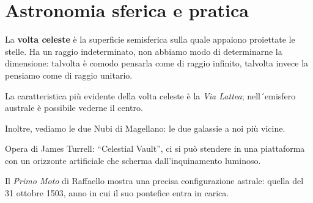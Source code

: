\documentclass[main.tex]{subfiles}
\begin{document}
\section{Astronomia sferica e pratica}


La \textbf{volta celeste} è la superficie semisferica sulla quale appaiono proiettate le stelle. Ha un raggio indeterminato, non abbiamo modo di determinarne la dimensione: talvolta è comodo pensarla come di raggio infinito, talvolta invece la pensiamo come di raggio unitario.

La caratteristica più evidente della volta celeste è la \textit{Via Lattea}; nell´emisfero australe è possibile vederne il centro. 


Inoltre, vediamo le due Nubi di Magellano: le due galassie a noi più vicine. 

Opera di James Turrell: ``Celestial Vault'', ci si può stendere in una piattaforma con un orizzonte artificiale che scherma dall'inquinamento luminoso. 

Il \textit{Primo Moto} di Raffaello mostra una precisa configurazione astrale: quella del 31 ottobre 1503, anno in cui il suo pontefice entra in carica. 
\end{document}
